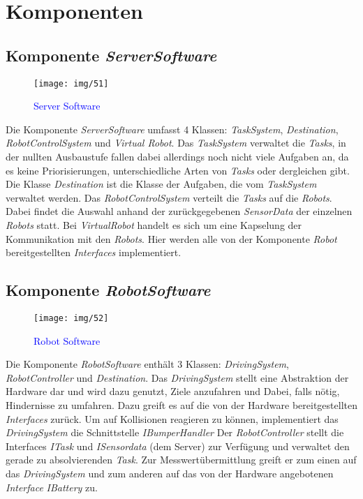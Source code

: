 \section{Komponenten}

\subsection{Komponente \textit{ServerSoftware}}
\begin{figure}[H]
\centering
\texttt{[image: img/51]}
\caption{\textcolor{blue}{Server Software}}
\label{KomponentenStruktur1}
\end{figure}
Die Komponente \textit{ServerSoftware} umfasst 4 Klassen: \textit{TaskSystem}, \textit{Destination}, \textit{RobotControlSystem} und \textit{Virtual Robot}.
Das \textit{TaskSystem} verwaltet die \textit{Tasks}, in der nullten Ausbaustufe fallen dabei allerdings noch nicht viele Aufgaben an, 
da es keine Priorisierungen, unterschiedliche Arten von \textit{Tasks} oder dergleichen gibt. Die Klasse \textit{Destination} ist die Klasse 
der Aufgaben, die vom \textit{TaskSystem} verwaltet werden. Das \textit{RobotControlSystem} verteilt die \textit{Tasks} auf die \textit{Robots}. 
Dabei findet die Auswahl anhand der zurückgegebenen \textit{SensorData} der einzelnen \textit{Robots} statt. Bei \textit{VirtualRobot} handelt 
es sich um eine Kapselung der Kommunikation mit den \textit{Robots}. Hier werden alle von der Komponente \textit{Robot} bereitgestellten 
\textit{Interfaces} implementiert.
\subsection{Komponente \textit{RobotSoftware}}
\begin{figure}[H]
\centering
\texttt{[image: img/52]}
\caption{\textcolor{blue}{Robot Software}}
\label{KomponentenStruktur2}
\end{figure}
Die Komponente \textit{RobotSoftware} enthält 3 Klassen: \textit{DrivingSystem}, \textit{RobotController} und \textit{Destination}. 
Das \textit{DrivingSystem} stellt eine Abstraktion der Hardware dar und wird dazu genutzt, Ziele anzufahren und Dabei, 
falls nötig, Hindernisse zu umfahren. Dazu greift es auf die von der Hardware bereitgestellten \textit{Interfaces} zurück. 
Um auf Kollisionen reagieren zu können, implementiert das \textit{DrivingSystem} die Schnittstelle \textit{IBumperHandler}
Der \textit{RobotController} stellt die Interfaces \textit{ITask} und \textit{ISensordata} (dem Server) zur Verfügung und verwaltet den gerade 
zu absolvierenden \textit{Task}. Zur Messwertübermittlung greift er zum einen auf das \textit{DrivingSystem} und zum anderen auf das 
von der Hardware angebotenen \textit{Interface} \textit{IBattery} zu.

